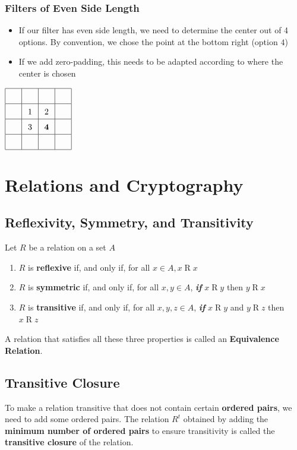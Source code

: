 \subsubsection{Filters of Even Side Length}
\begin{itemize}
  \item If our filter has even side length, we need to determine the center out of 4 options. By convention, we chose the point at the bottom right (option $4$)
  \item If we add zero-padding, this needs to be adapted according to where the center is chosen
\end{itemize}

$\renewcommand{\arraystretch}{1.5}\begin{array}{|c|c|c|c|}
\hline
\quad & \quad & \quad & \quad \\
\hline
& 1 & 2 & \\
\hline
& 3 & \bm{4} & \\
\hline
& & & \\
\hline
\end{array}$


\section{Relations and Cryptography}

\subsection{Reflexivity, Symmetry, and Transitivity}
Let $R$ be a relation on a set $A$

\begin{enumerate}
  \item $R$ is \textbf{reflexive} if, and only if, for all $x \in A, x \mathrel{R} x$
  \item $R$ is \textbf{symmetric} if, and only if, for all $x, y \in A$, \textbf{\textit{if}} $x \mathrel{R} y$ then $y \mathrel{R} x$
  \item $R$ is \textbf{transitive} if, and only if, for all $x, y, z \in A$, \textbf{\textit{if}} $x \mathrel{R} y$ and $y \mathrel{R} z$ then $x \mathrel{R} z$
\end{enumerate}

A relation that satisfies all these three properties is called an \textbf{Equivalence Relation}.

\subsection{Transitive Closure}
To make a relation transitive that does not contain certain \textbf{ordered pairs}, we need to add some ordered pairs. The relation $R^{t}$ obtained by adding the \textbf{minimum number of ordered pairs} to ensure transitivity is called the \textbf{transitive closure} of the relation.

